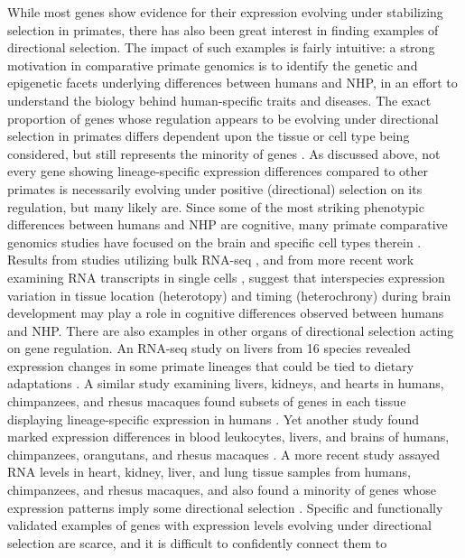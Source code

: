 {While most genes show evidence for their expression evolving under stabilizing selection in primates, there has also been great interest in finding examples of directional selection. The impact of such examples is fairly intuitive: a strong motivation in comparative primate genomics is to identify the genetic and epigenetic facets underlying differences between humans and NHP, in an effort to understand the biology behind human-specific traits and diseases. The exact proportion of genes whose regulation appears to be evolving under directional selection in primates differs dependent upon the tissue or cell type being considered, but still represents the minority of genes \cite{Romero, Ruvinsky and Gilad 2012}. As discussed above, not every gene showing lineage-specific expression differences compared to other primates is necessarily evolving under positive (directional) selection on its regulation, but many likely are. Since some of the most striking phenotypic differences between humans and NHP are cognitive, many primate comparative genomics studies have focused on the brain and specific cell types therein \cite{Nowick et al 2009 (Difference in human and chimpanzee gene expression patterns define an evolving network of transcription factors in brain), Giger et al. 2010 (Evolution of Neuronal and Endothelial Transcriptomes in Primates)}. Results from studies utilizing bulk RNA-seq \cite{Somel et al 2009 (Transcriptional neoteny in the human brain)}, and from more recent work examining RNA transcripts in single cells \cite{Mora-Bermudez et al. 2016 (Differences and similarities between human and chimpanzee neural progenitors...), Zhu et al. 2018 (Spatiotemporal transcriptomic divergence across human and macaque brain development), Sousa et al. 2017 (Molecular and cellular reorganization of neural circuits in the human lineage)}, suggest that interspecies expression variation in tissue location (heterotopy) and timing (heterochrony) during brain development may play a role in cognitive differences observed between humans and NHP. There are also examples in other organs of directional selection acting on gene regulation. An RNA-seq study on livers from 16 species revealed expression changes in some primate lineages that could be tied to dietary adaptations \cite{Perry et al 2011 (Comparative RNA sequencing reveals substantial...)}. A similar study examining livers, kidneys, and hearts in humans, chimpanzees, and rhesus macaques found subsets of genes in each tissue displaying lineage-specific expression in humans \cite{Blekhman et al 2008}. Yet another study found marked expression differences in blood leukocytes, livers, and brains of humans, chimpanzees, orangutans, and rhesus macaques \cite{Enard et al 2002 (Intra- and Interspecific Variation in Primate Gene Expression Patterns)}. A more recent study assayed RNA levels in heart, kidney, liver, and lung tissue samples from humans, chimpanzees, and rhesus macaques, and also found a minority of genes whose expression patterns imply some directional selection \cite{Blake et al. 2020 (A comparison of gene expression and DNA methylation patterns...)}. Specific and functionally validated examples of genes with expression levels evolving under directional selection are scarce, and it is difficult to confidently connect them to }
